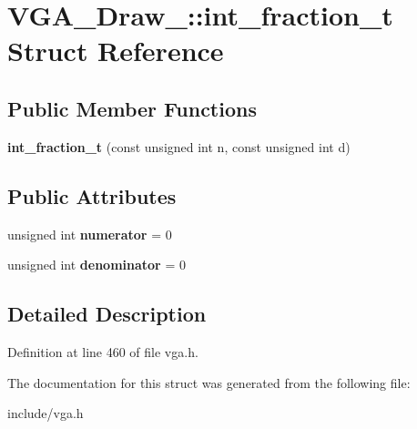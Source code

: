 \hypertarget{structVGA__Draw__2_1_1int__fraction__t}{\section{V\-G\-A\-\_\-\-Draw\-\_\-:\-:int\-\_\-fraction\-\_\-t Struct Reference}
\label{structVGA__Draw__2_1_1int__fraction__t}
}
\subsection*{Public Member Functions}
\begin{DoxyCompactItemize}
\item 
\hypertarget{structVGA__Draw__2_1_1int__fraction__t_a7225e2ad118e772718bea721ec9ab624}{{\bfseries int\-\_\-fraction\-\_\-t} (const unsigned int n, const unsigned int d)}\label{structVGA__Draw__2_1_1int__fraction__t_a7225e2ad118e772718bea721ec9ab624}

\end{DoxyCompactItemize}
\subsection*{Public Attributes}
\begin{DoxyCompactItemize}
\item 
\hypertarget{structVGA__Draw__2_1_1int__fraction__t_acf6283aa0d964da94db35bf42f261fed}{unsigned int {\bfseries numerator} = 0}\label{structVGA__Draw__2_1_1int__fraction__t_acf6283aa0d964da94db35bf42f261fed}

\item 
\hypertarget{structVGA__Draw__2_1_1int__fraction__t_a5ff147e3096a0b920624aef5281d1c69}{unsigned int {\bfseries denominator} = 0}\label{structVGA__Draw__2_1_1int__fraction__t_a5ff147e3096a0b920624aef5281d1c69}

\end{DoxyCompactItemize}


\subsection{Detailed Description}


Definition at line 460 of file vga.\-h.



The documentation for this struct was generated from the following file\-:\begin{DoxyCompactItemize}
\item 
include/vga.\-h\end{DoxyCompactItemize}
